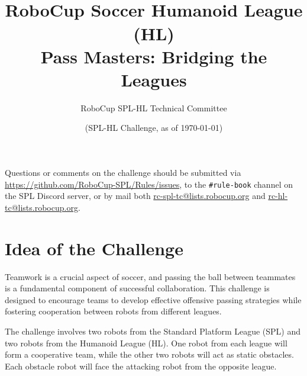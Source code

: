 \documentclass[12pt]{article}
\title{\leaguename\\RoboCup Soccer Humanoid League (HL)
\\Pass Masters: Bridging the Leagues}
\author{RoboCup SPL-HL Technical Committee}
\date{(\RCYear SPL-HL Challenge, as of \today)}
\begin{document}
\maketitle
\thispagestyle{empty}

\begin{center}
Questions or comments on the challenge should be submitted via \url{https://github.com/RoboCup-SPL/Rules/issues}, to the \texttt{\#rule-book} channel on the SPL Discord server, or by mail both \url{rc-spl-tc@lists.robocup.org} and \url{rc-hl-tc@lists.robocup.org}.
\end{center}

\newpage


\thispagestyle{fancy}

\clearpage

\cfoot{\thepage}
\setcounter{page}{1}


\section{Idea of the Challenge}
Teamwork is a crucial aspect of soccer, and passing the ball between teammates is a fundamental component of successful collaboration.
This challenge is designed to encourage teams to develop effective offensive passing strategies while fostering cooperation between robots from different leagues.

The challenge involves two robots from the Standard Platform League (SPL) and two robots from the Humanoid League (HL).
One robot from each league will form a cooperative team, while the other two robots will act as static obstacles.
Each obstacle robot will face the attacking robot from the opposite league.
\end{document}
